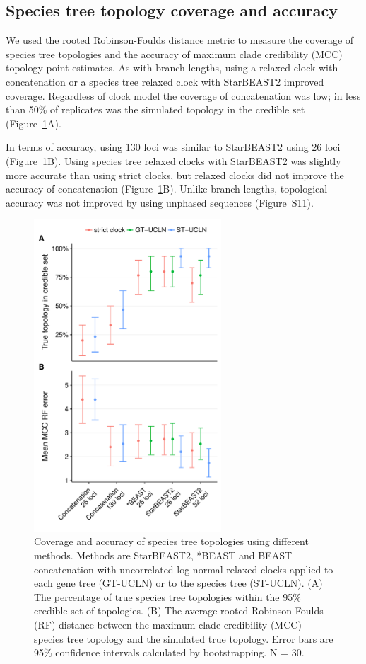 \documentclass[12pt]{article}
\begin{document}
\subsection{Species tree topology coverage and accuracy}

We used the rooted Robinson-Foulds distance metric to measure the coverage of
species tree topologies and the accuracy of maximum clade credibility (MCC)
topology point estimates. As with branch lengths, using a relaxed clock with
concatenation or a species tree relaxed clock with StarBEAST2 improved
coverage. Regardless of clock model the coverage of concatenation was low; in
less than 50\% of replicates was the simulated topology in the credible set
(Figure~\ref{fig:treeTopologyError}A).

In terms of accuracy, using 130 loci was similar to StarBEAST2 using 26 loci
(Figure~\ref{fig:treeTopologyError}B). Using species tree relaxed clocks with
StarBEAST2 was slightly more accurate than using strict clocks, but relaxed
clocks did not improve the accuracy of concatenation
(Figure~\ref{fig:treeTopologyError}B). Unlike branch lengths, topological
accuracy was not improved by using unphased sequences (Figure~S11).

\begin{figure}[htb!]
\centering
\includegraphics[width=70mm]{topology_accuracy_phased.pdf}
\caption
{Coverage and accuracy of species tree topologies using different methods.
Methods are StarBEAST2, *BEAST and BEAST concatenation with uncorrelated
log-normal relaxed clocks applied to each gene tree (GT-UCLN) or to the species
tree (ST-UCLN). (A) The percentage of true species tree topologies within the
95\% credible set of topologies. (B) The average rooted Robinson-Foulds (RF)
distance between the maximum clade credibility (MCC) species tree topology and
the simulated true topology. Error bars are 95\% confidence intervals
calculated by bootstrapping. N = 30.}
\label{fig:treeTopologyError}
\end{figure}
\end{document}
